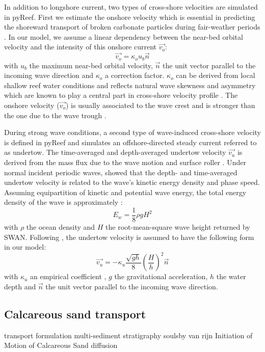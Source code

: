 \documentclass[default,jgrga]{agutex2015}
\begin{document}
\begin{article}
In addition to longshore current, two types of cross-shore velocities are simulated in pyReef. First we estimate the onshore velocity which is essential in predicting the shoreward transport of broken carbonate particles during fair-weather periods  \citep{Elfrink99, Ruessink98}. In our model, we assume a linear dependency between the near-bed orbital velocity and the intensity of this onshore current $\vec{v_o}$:
\begin{equation}
\vec{v_o} = \kappa_o u_b \vec{n}
\end{equation}
with $u_b$ the maximum near-bed orbital velocity, $\vec{n}$ the unit vector parallel to the incoming wave direction and $\kappa_o$ a correction factor. $\kappa_o$ can be derived from local shallow reef water conditions and reflects natural wave skewness and asymmetry which are known to play a central part in cross-shore velocity profile \citep{Grasmeijer03, Crawford03}. The onshore velocity ($\vec{v_o}$) is usually associated to the wave crest and is stronger than the one due to the wave trough \citep{Isobe82, Grasmeijer03}. 

During strong wave conditions, a second type of wave-induced cross-shore velocity is defined in pyReef and simulates an offshore-directed steady current referred to as undertow. The time-averaged and depth-averaged undertow velocity $\vec{v_u}$ is derived from the mass flux due to the wave motion and surface roller \citep{Svendsen87}. Under normal incident periodic waves, \citet{Longuet-Higgins75} showed that the depth- and time-averaged undertow velocity is related to the wave's kinetic energy density and phase speed. Assuming  equipartition of kinetic and potential wave energy, the total energy density of the wave is approximately \citep{Svendsen84}:
\begin{equation}
E_w = \frac{1}{8} \rho g H^2
\end{equation}
with $\rho$ the ocean density and  $H$ the root-mean-square wave height returned by SWAN. Following \citet{Cox98}, the undertow velocity is assumed to have the following form in our model:
\begin{equation}
\vec{v_u} = - \kappa_u \frac{\sqrt{g h}}{8} \left(\frac{H}{h} \right)^2 \vec{n}
\end{equation}
with $\kappa_u$ an empirical coefficient \citep{Kobayashi98}, $g$ the gravitational acceleration, $h$ the water depth and $\vec{n}$ the unit vector parallel to the incoming wave direction.
   
\subsection{Calcareous sand transport}
transport formulation multi-sediment stratigraphy
soulsby van rijn
Initiation of Motion of Calcareous Sand
diffusion


\end{article}
\end{document}
